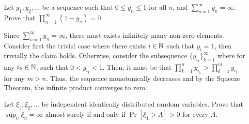 \begin{problem}{1}
    Let $y_1, y_2,\ldots$ be a sequence such that $0 \leq y_n \leq 1$ for all $n$, and $\sum_{n=1}^\infty y_n = \infty$. Prove that $\prod_{n=1}^\infty (1-y_n) = 0$.
\end{problem}
\begin{solution}
    Since $\sum_{n=1}^\infty y_n = \infty$, there must exists infinitely many non-zero elements. Consider first the trivial case where there exists $i \in \mathbb{N}$ such that $y_i = 1$, then trivially the claim holds. Otherwise, consider the subsequence $\{y_{i_k}\}_{k=1}^\infty$ where for any $i_k\in\mathbb{N}$, such that $0 < y_{i_k} < 1$. Then, it must be that $\prod_{k=1}^{n} y_{i_k} > \prod_{k=1}^m y_{i_k}$ for any $m > n$. Thus, the sequence monotonically decreases and by the Squeeze Theorem, the infinite product converges to zero.
\end{solution}

\begin{problem}{2}
    Let $\xi_1,\xi_2,\ldots$ be independent identically distributed random variables. Prove that $\sup_n \xi_n = \infty$ almost surely if and only if $\Pr[\xi_1 > A] > 0$ for every $A$. 
\end{problem}
\begin{solution}
    
\end{solution}